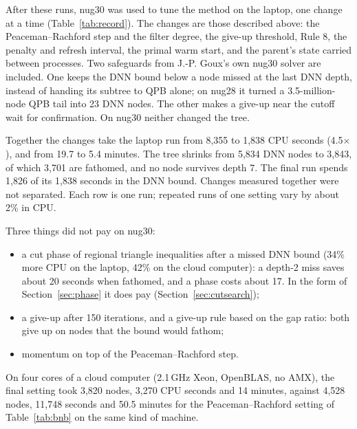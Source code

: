 \documentclass[10pt]{article}
\theoremstyle{remark}
\begin{document}
After these runs, nug30 was used to tune the method on the laptop, one change at a
time (Table~\ref{tab:record}). The changes are those described above: the
Peaceman--Rachford step and the filter degree, the give-up threshold, Rule 8, the
penalty and refresh interval, the primal warm start, and the parent's state carried
between processes. Two safeguards from J.-P. Goux's own nug30 solver are included.
One keeps the DNN bound below a node missed at the last DNN depth, instead of
handing its subtree to QPB alone; on nug28 it turned a 3.5-million-node QPB tail
into 23 DNN nodes. The other makes a give-up near the cutoff wait for confirmation.
On nug30 neither changed the tree.

Together the changes take the laptop run from 8,355 to 1,838 CPU seconds (4.5$\times$),
and from 19.7 to 5.4 minutes. The tree shrinks from 5,834 DNN nodes to 3,843, of
which 3,701 are fathomed, and no node survives depth 7. The final run spends 1,826
of its 1,838 seconds in the DNN bound. Changes measured together were not separated.
Each row is one run; repeated runs of one setting vary by about 2\% in CPU.

Three things did not pay on nug30:
\begin{itemize}
\item a cut phase of regional triangle inequalities after a missed DNN bound
  (34\% more CPU on the laptop, 42\% on the cloud computer): a depth-2 miss saves
  about 20 seconds when fathomed, and a phase costs about 17. In the form of
  Section~\ref{sec:phase} it does pay (Section~\ref{sec:cutsearch});
\item a give-up after 150 iterations, and a give-up rule based on the gap ratio: both
  give up on nodes that the bound would fathom;
\item momentum on top of the Peaceman--Rachford step.
\end{itemize}
On four cores of a cloud computer (2.1\,GHz Xeon, OpenBLAS, no AMX), the final
setting took 3,820 nodes, 3,270 CPU seconds and 14 minutes, against 4,528 nodes,
11,748 seconds and 50.5 minutes for the Peaceman--Rachford setting of Table~\ref{tab:bnb}
on the same kind of machine.
\end{document}
